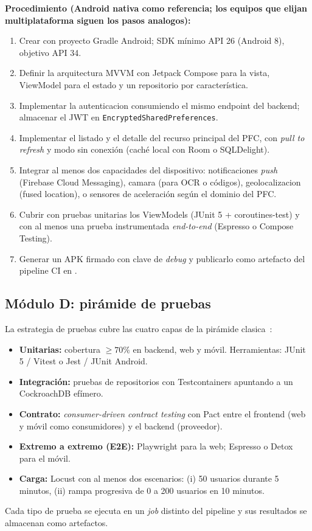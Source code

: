 \documentclass[11pt,a4paper]{article}
\begin{document}
    \textbf{Procedimiento (Android nativa como referencia; los equipos que elijan multiplataforma siguen los pasos analogos):}
    \begin{enumerate}
        \item Crear  con proyecto Gradle Android; SDK mínimo API 26 (Android 8), objetivo API 34.
        \item Definir la arquitectura MVVM con Jetpack Compose para la vista, ViewModel para el estado y un repositorio por característica.
        \item Implementar la autenticacion consumiendo el mismo endpoint  del backend; almacenar el JWT en \texttt{EncryptedSharedPreferences}.
        \item Implementar el listado y el detalle del recurso principal del PFC, con \textit{pull to refresh} y modo sin conexión (caché local con Room o SQLDelight).
        \item Integrar al menos dos capacidades del dispositivo: notificaciones \textit{push} (Firebase Cloud Messaging), camara (para OCR o códigos), geolocalizacion (fused location), o sensores de aceleración según el dominio del PFC.
        \item Cubrir con pruebas unitarias los ViewModels (JUnit 5 + coroutines-test) y con al menos una prueba instrumentada \textit{end-to-end} (Espresso o Compose Testing).
        \item Generar un APK firmado con clave de \emph{debug} y publicarlo como artefacto del pipeline CI en .
    \end{enumerate}

\subsection{Módulo D: pirámide de pruebas}

    La estrategia de pruebas cubre las cuatro capas de la pirámide clasica~\cite{Ammann2016SWTesting,Winters2020SEatGoogle}:
    \begin{itemize}
        \item \textbf{Unitarias:} cobertura $\ge 70\%$ en backend, web y móvil. Herramientas: JUnit 5 / Vitest o Jest / JUnit Android.
        \item \textbf{Integración:} pruebas de repositorios con Testcontainers apuntando a un CockroachDB efímero.
        \item \textbf{Contrato:} \emph{consumer-driven contract testing} con Pact entre el frontend (web y móvil como consumidores) y el backend (proveedor).
        \item \textbf{Extremo a extremo (E2E):} Playwright para la web; Espresso o Detox para el móvil.
        \item \textbf{Carga:} Locust con al menos dos escenarios: (i) 50 usuarios durante 5 minutos, (ii) rampa progresiva de 0 a 200 usuarios en 10 minutos.
    \end{itemize}
    Cada tipo de prueba se ejecuta en un \textit{job} distinto del pipeline y sus resultados se almacenan como artefactos.
\end{document}
